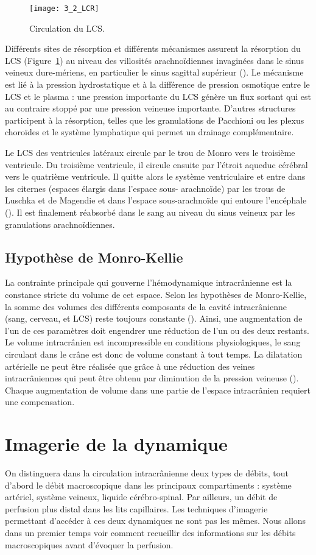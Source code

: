 \begin{figure}[!t]
\centering
\texttt{[image: 3\_2\_LCR]}
\caption{Circulation du LCS.}
\label{fig:3_2_LCR}	
\end{figure}
Différents sites de résorption et différents mécanismes assurent la résorption du LCS (Figure~\ref{fig:3_2_LCR}) au niveau des villosités arachnoïdiennes invaginées dans le sinus veineux dure-mériens, en
particulier le sinus sagittal supérieur (\cite{Segal2001}). Le mécanisme est lié à la pression hydrostatique et à la
différence de pression osmotique entre le LCS et le plasma : une pression importante du LCS génère
un flux sortant qui est au contraire stoppé par une pression veineuse importante. D’autres structures participent à la résorption, telles que les granulations de Pacchioni ou les plexus choroïdes et le
système lymphatique qui permet un drainage complémentaire.

Le LCS des ventricules latéraux circule par le trou de Monro vers le troisième ventricule. Du
troisième ventricule, il circule ensuite par l’étroit aqueduc cérébral vers le quatrième ventricule. Il
quitte alors le système ventriculaire et entre dans les citernes (espaces élargis dans l’espace sous-
arachnoïde) par les trous de Luschka et de Magendie et dans l’espace sous-arachnoïde qui entoure
l’encéphale (\cite{Bernard2007}). Il est finalement réabsorbé dans le sang au niveau du sinus veineux par les
granulations arachnoïdiennes.
\subsection{Hypothèse de Monro-Kellie}
La contrainte principale qui gouverne l’hémodynamique intracrânienne est la constance stricte
du volume de cet espace. Selon les hypothèses de Monro-Kellie, la somme des volumes des différents
composants de la cavité intracrânienne (sang, cerveau, et LCS) reste toujours constante (\cite{Carmelo2002}). Ainsi, une
augmentation de l’un de ces paramètres doit engendrer une réduction de l’un ou des deux restants.
Le volume intracrânien est incompressible en conditions physiologiques, le sang circulant dans le crâne
est donc de volume constant à tout temps. La dilatation artérielle ne peut être réalisée que grâce à
une réduction des veines intracrâniennes qui peut être obtenu par diminution de la pression veineuse
(\cite{Wei1982}). Chaque augmentation de volume dans une partie de l’espace intracrânien requiert une
compensation.
\section{Imagerie de la dynamique}
On distinguera dans la circulation intracrânienne deux types de débits, tout d’abord le débit
macroscopique dans les principaux compartiments : système artériel, système veineux, liquide
cérébro-spinal. Par ailleurs, un débit de perfusion plus distal dans les lits capillaires. Les techniques
d’imagerie permettant d’accéder à ces deux dynamiques ne sont pas les mêmes. Nous allons dans un
premier temps voir comment recueillir des informations sur les débits macroscopiques avant
d’évoquer la perfusion.
